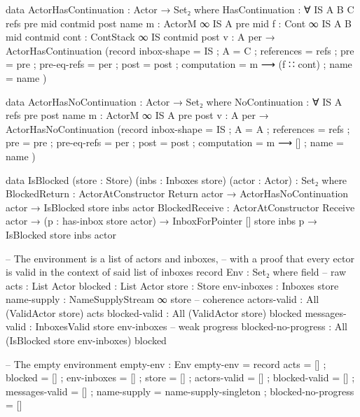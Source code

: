 \begin{code}
data ActorHasContinuation : Actor → Set₂ where
  HasContinuation :
    ∀ {IS A B C refs pre mid contmid post name}
    {m : ActorM ∞ IS A pre mid}
    {f : Cont ∞ IS {A} {B} mid contmid}
    {cont : ContStack ∞ IS contmid post}
    {v : A}
    {per} →
    ActorHasContinuation (record
      { inbox-shape = IS
      ; A = C
      ; references = refs
      ; pre = pre
      ; pre-eq-refs = per
      ; post = post
      ; computation = m ⟶ (f ∷ cont)
      ; name = name
      })

data ActorHasNoContinuation : Actor → Set₂ where
  NoContinuation :
    ∀ {IS A refs pre post name}
    {m : ActorM ∞ IS A pre post}
    {v : A}
    {per} →
    ActorHasNoContinuation (record
      { inbox-shape = IS
      ; A = A
      ; references = refs
      ; pre = pre
      ; pre-eq-refs = per
      ; post = post
      ; computation = m ⟶ []
      ; name = name
      })

data IsBlocked (store : Store) (inbs : Inboxes store) (actor : Actor) : Set₂ where
  BlockedReturn :
    ActorAtConstructor Return actor →
    ActorHasNoContinuation actor →
    IsBlocked store inbs actor
  BlockedReceive :
    ActorAtConstructor Receive actor →
    (p : has-inbox store actor) →
    InboxForPointer [] store inbs p →
    IsBlocked store inbs actor

-- The environment is a list of actors and inboxes,
-- with a proof that every ector is valid in the context of said list of inboxes
record Env : Set₂ where
  field
    -- raw
    acts : List Actor
    blocked : List Actor
    store : Store
    env-inboxes : Inboxes store
    name-supply : NameSupplyStream ∞ store
    -- coherence
    actors-valid : All (ValidActor store) acts
    blocked-valid : All (ValidActor store) blocked
    messages-valid : InboxesValid store env-inboxes
    -- weak progress
    blocked-no-progress : All (IsBlocked store env-inboxes) blocked

-- The empty environment
empty-env : Env
empty-env = record
             { acts = []
             ; blocked = []
             ; env-inboxes = []
             ; store = []
             ; actors-valid = []
             ; blocked-valid = []
             ; messages-valid = []
             ; name-supply = name-supply-singleton
             ; blocked-no-progress = []
             }


\end{code}
